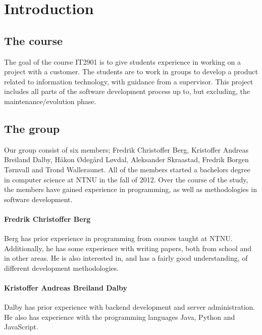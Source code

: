 
\chapter{Introduction}
\label{ch:introduction}

\section{The course}
\label{sec:introduction-the_course}

The goal of the course IT2901 is to give students experience in working on a project with a customer. The students are to work in groups to develop a product related to information technology, with guidance from a supervisor. This project includes all parts of the software development process up to, but excluding, the maintenance/evolution phase.

\section{The group}
\label{sec:introduction-the_group}

Our group consist of six members; Fredrik Christoffer Berg, Kristoffer Andreas Breiland Dalby, Håkon Ødegård Løvdal, Aleksander Skraastad, Fredrik Borgen Tørnvall and Trond Walleraunet. All of the members started a bachelors degree in computer science at NTNU in the fall of 2012. Over the course of the study, the members have gained experience in programming, as well as methodologies in software development.

\subsubsection{Fredrik Christoffer Berg}

Berg has prior experience in programming from courses taught at NTNU. Additionally, he has some experience with writing papers, both from school and in other areas. He is also interested in, and has a fairly good understanding, of different development methodologies.

\subsubsection{Kristoffer Andreas Breiland Dalby}

Dalby has prior experience with backend development and server administration. He also has experience with the programming languages Java, Python and JavaScript.

